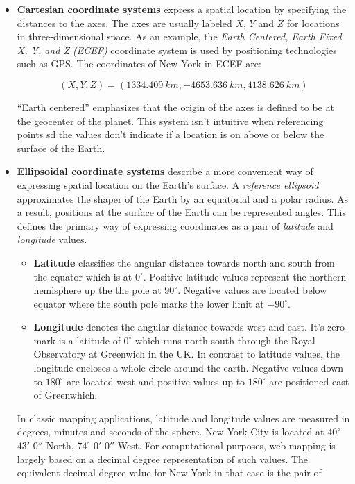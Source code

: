 \begin{itemize}

\item \textbf{Cartesian coordinate systems} express a spatial location by specifying the distances to the axes. The axes are usually labeled $X$, $Y$ and $Z$ for locations in three-dimensional space. As an example, the \textit{Earth Centered, Earth Fixed X, Y, and Z (ECEF)} coordinate system is used by positioning technologies such as GPS. The coordinates of New York in ECEF are:

\[ (X, Y, Z) = (1334.409~km, -4653.636~km, 4138.626~km) \]

``Earth centered'' emphasizes that the origin of the axes is defined to be at the geocenter of the planet. This system isn't intuitive when referencing points sd the values don't indicate if a location is on above or below the surface of the Earth. 

\item \textbf{Ellipsoidal coordinate systems} describe a more convenient way of expressing spatial location on the Earth's surface. A \textit{reference ellipsoid} approximates the shaper of the Earth by an equatorial and a polar radius. As a result, positions at the surface of the Earth can be represented angles. This defines the primary way of expressing coordinates as a pair of \textit{latitude} and \textit{longitude} values.

  \begin{itemize}

  \item \textbf{Latitude} classifies the angular distance towards north and south from the equator which is at $0^\circ$. Positive latitude values represent the northern hemisphere up the the pole at $90^\circ$. Negative values are located below equator where the south pole marks the lower limit at $-90^\circ$.

  \item \textbf{Longitude} denotes the angular distance towards west and east. It's zero-mark is a latitude of $0^\circ$  which runs north-south through the Royal Observatory at Greenwich in the UK. In contrast to latitude values, the longitude encloses a whole circle around the earth. Negative values down to $180^\circ$ are located west and positive values up to $180^\circ$ are positioned east of Greenwhich.

  \end{itemize}

In classic mapping applications, latitude and longitude values are measured in degrees, minutes and seconds of the sphere. New York City is located at $40^\circ$ $43'$ $0''$ North, $74^\circ$ $0'$ $0''$ West. For computational purposes, web mapping is largely based on a decimal degree representation of such values. The equivalent decimal degree value for New York in that case is the pair of


\end{itemize}
